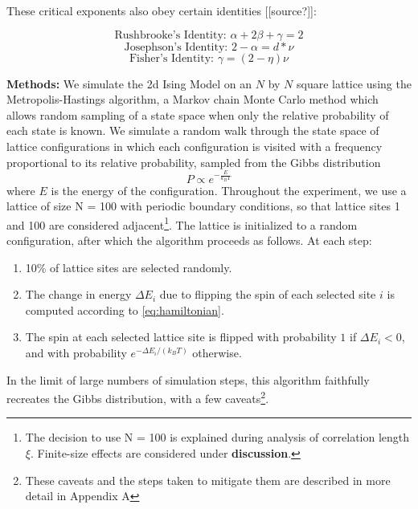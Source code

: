 \documentclass[letter,scriptaddress,twocolumn, prl,nofootinbib]{revtex4}
\begin{document}
These critical exponents also obey certain identities [[source?]]:

\begin{equation}
	\text{Rushbrooke's Identity: } \alpha + 2\beta + \gamma = 2 \label{eq:rushbrooke}
\end{equation}
\begin{equation}
	\text{Josephson's Identity: } 2 - \alpha = d * \nu \label{eq:josephson}
\end{equation}
\begin{equation}
	\text{Fisher's Identity: } \gamma = (2 - \eta)\nu \label{eq:fisher}
\end{equation}

\textbf{Methods:} We simulate the 2d Ising Model on an $N$ by $N$ square lattice using the Metropolis-Hastings algorithm, a Markov chain Monte Carlo method which allows random sampling of a state space when only the relative probability of each state is known. We simulate a random walk through the state space of lattice configurations in which each configuration is visited with a frequency proportional to its relative probability, sampled from the Gibbs distribution
\begin{equation}
	P \propto e^{-\frac{E}{k_B T}}
\end{equation}
where $E$ is the energy of the configuration. Throughout the experiment, we use a lattice of size N = 100 with periodic boundary conditions, so that lattice sites 1 and 100 are considered adjacent\footnote{The decision to use N = 100 is explained during analysis of correlation length $\xi$. Finite-size effects are considered under \textbf{discussion}.}. The lattice is initialized to a random configuration, after which the algorithm proceeds as follows. At each step:
\begin{enumerate}
	\item 10\% of lattice sites are selected randomly.
	\item The change in energy $\Delta E_i$ due to flipping the spin of each selected site $i$ is computed according to \autoref{eq:hamiltonian}.
	\item The spin at each selected lattice site is flipped with probability $1$ if $\Delta E_i < 0$, and with probability $e^{-\Delta E_i/(k_BT)}$ otherwise.
\end{enumerate}

In the limit of large numbers of simulation steps, this algorithm faithfully recreates the Gibbs distribution, with a few caveats\footnote{These caveats and the steps taken to mitigate them are described in more detail in Appendix A}.
\end{document}
